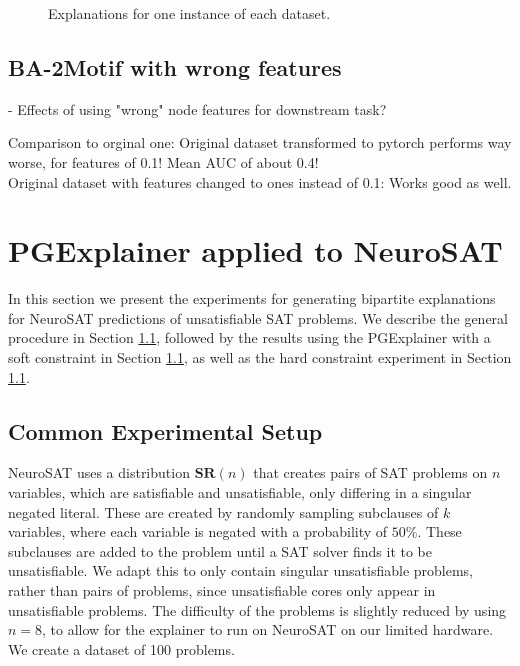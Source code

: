 \begin{figure}[h]
    \caption{Explanations for one instance of each dataset.}
    \label{fig:qual_expl}
\end{figure}





\subsection{BA-2Motif with wrong features}
- Effects of using "wrong" node features for downstream task?

Comparison to orginal one: Original dataset transformed to pytorch performs way worse, for features of 0.1! Mean AUC of about 0.4! \\
Original dataset with features changed to ones instead of 0.1: Works good as well.



\section{PGExplainer applied to NeuroSAT}
\label{sec:SAT-experiments}

In this section we present the experiments for generating bipartite explanations for NeuroSAT \cite{selsam2018learning} predictions of unsatisfiable SAT problems. We describe the general procedure in Section \ref{}, followed by the results using the PGExplainer with a soft constraint in Section \ref{}, as well as the hard constraint experiment in Section \ref{}.

\subsection{Common Experimental Setup}

NeuroSAT \cite{selsam2018learning} uses a distribution $\textbf{SR}(n)$ that creates pairs of SAT problems on $n$ variables, which are satisfiable and unsatisfiable, only differing in a singular negated literal. These are created by randomly sampling subclauses of $k$ variables, where each variable is negated with a probability of $50\%$. These subclauses are added to the problem until a SAT solver \cite{een2003extensible} finds it to be unsatisfiable. We adapt this to only contain singular unsatisfiable problems, rather than pairs of problems, since unsatisfiable cores only appear in unsatisfiable problems. The difficulty of the problems is slightly reduced by using $n=8$, to allow for the explainer to run on NeuroSAT on our limited hardware. We create a dataset of 100 problems.

